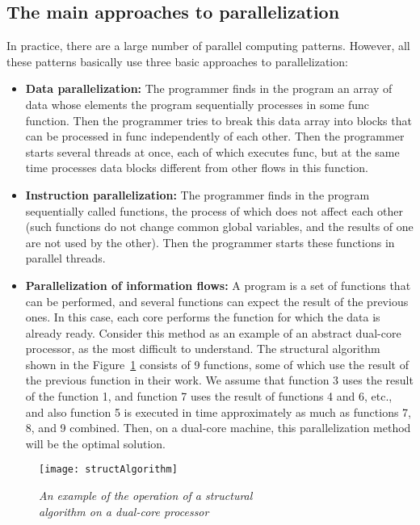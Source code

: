 { %
	\subsection{The main approaches to parallelization}
	\par In practice, there are a large number of parallel computing patterns. However, all these patterns basically use three basic approaches to parallelization:
	\begin{itemize}
		\item\textbf{Data parallelization:} The programmer finds in the program an array of data whose elements the program sequentially processes in some func function. Then the programmer tries to break this data array into blocks that can be processed in func independently of each other. Then the programmer starts several threads at once, each of which executes func, but at the same time processes data blocks different from other flows in this function.
		\item\textbf{Instruction parallelization:} The programmer finds in the program sequentially called functions, the process of which does not affect each other (such functions do not change common global variables, and the results of one are not used by the other). Then the programmer starts these functions in parallel threads.
		\item\textbf{Parallelization of information flows:} A program is a set of functions that can be performed, and several functions can expect the result of the previous ones. In this case, each core performs the function for which the data is already ready. Consider this method as an example of an abstract dual-core processor, as the most difficult to understand. The structural algorithm shown in the Figure~\ref{structAlgorithm:image} consists of 9 functions, some of which use the result of the previous function in their work. We assume that function 3 uses the result of the function 1, and function 7 uses the result of functions 4 and 6, etc., and also function 5 is executed in time approximately as much as functions 7, 8, and 9 combined. Then, on a dual-core machine, this parallelization method will be the optimal solution.
	\end{itemize}
	\begin{figure}[H]
		\texttt{[image: structAlgorithm]}
		\caption{\textit{An example of the operation of a structural \\algorithm on a dual-core processor}}
		\label{structAlgorithm:image}
	\end{figure}
}
